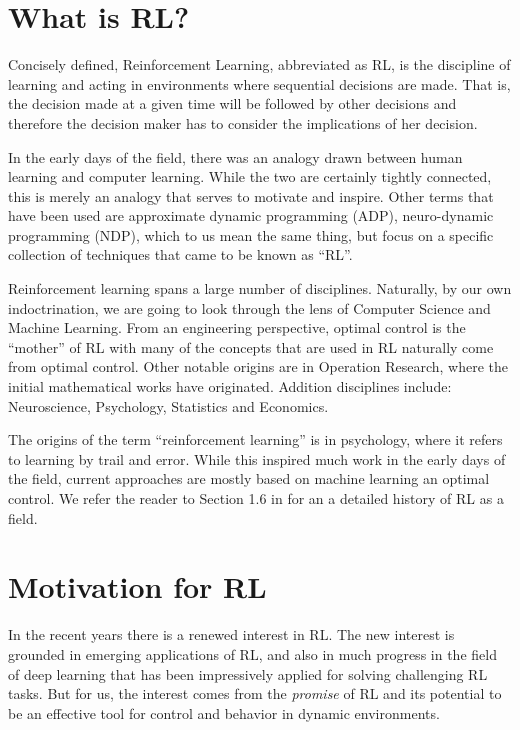 \section{What is RL?}

Concisely defined, Reinforcement Learning, abbreviated as RL, is the discipline of learning and acting in 
environments where sequential decisions are made. That is, the decision made at a given time 
will be followed by other decisions and therefore the decision maker has to consider the implications 
of her decision.

In the early days of the field, there was an analogy drawn between human learning and computer 
learning. While the two are certainly tightly connected, this is merely an analogy that serves to motivate and inspire. Other terms that 
have been used are approximate dynamic programming (ADP), neuro-dynamic programming (NDP), which to us
mean the same thing, but focus on a specific collection of techniques that came to be known as ``RL''.

 \medskip
{}
%
Reinforcement learning spans a large number of disciplines.
Naturally, by our own indoctrination, we are going to look through the lens of Computer Science
and Machine Learning. From an engineering perspective, optimal control is 
the ``mother'' of RL with many of the concepts that are used in RL naturally come from optimal control. 
Other notable origins are in Operation Research, where the initial mathematical works have originated.
Addition disciplines include: Neuroscience, Psychology, Statistics and
Economics.

The origins of the term ``reinforcement learning'' is in psychology, where it refers to learning by trail and error. 
While this inspired much work in the early days of the field, current approaches are mostly based on
machine learning an optimal control. We refer the reader to Section 1.6 in \cite{book:Sutton} for an
a detailed history of RL as a field. 

\section{Motivation for RL}

In the recent years there is a renewed interest in RL. The new interest is grounded in  emerging applications
of RL, and also in much progress in the field of deep learning that
has been impressively applied for solving challenging RL tasks. 
But for us, the interest comes from the {\em promise} of RL and its
potential to be an effective tool for control and behavior in dynamic environments.

